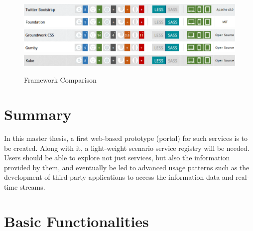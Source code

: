 \begin{figure}[!ht]
\centering
\includegraphics[scale=0.7]{images/Bootstrap&Foundation.png}
\includegraphics[scale=0.7]{images/Groundwork&Gumby.png} 
\includegraphics[scale=0.7]{images/Kube.png}  
\caption[Framework Comparison]{Framework Comparison}
\label{img:Bootstrap&Foundation.png}
\label{img:Groundwork&Gumby.png}   
\label{img:Kube.png}                          
\end{figure}

\section{Summary}
In this master thesis, a first web-based prototype (portal) for such services is to be
created. Along with it, a light-weight scenario service registry will be needed. Users
should be able to explore not just services, but also the information provided by
them, and eventually be led to advanced usage patterns such as the development
of third-party applications to access the information data and real-time streams.
\section{Basic Functionalities}

